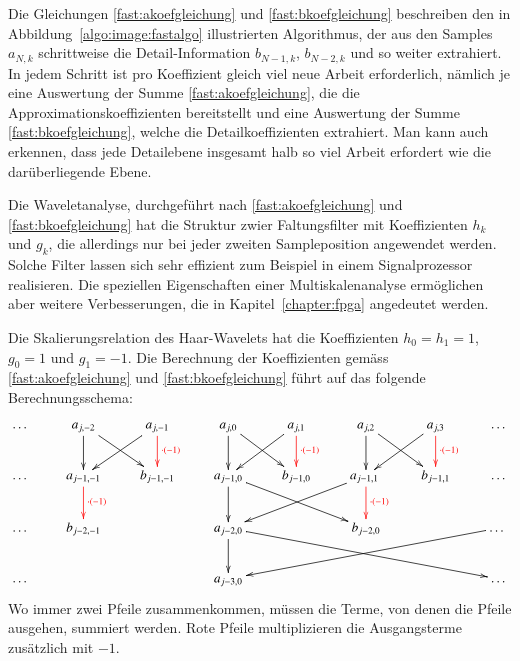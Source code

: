 Die Gleichungen \eqref{fast:akoefgleichung} und \eqref{fast:bkoefgleichung}
beschreiben den in Abbildung~\ref{algo:image:fastalgo} illustrierten
Algorithmus, der aus den Samples $a_{N,k}$ schrittweise die
Detail-Information $b_{N-1,k}$, $b_{N-2,k}$ und so weiter extrahiert.
In jedem Schritt ist pro Koeffizient gleich viel neue Arbeit erforderlich,
nämlich je eine Auswertung der Summe \eqref{fast:akoefgleichung}, die die
Approximationskoeffizienten bereitstellt und eine Auswertung der Summe
\eqref{fast:bkoefgleichung}, welche die Detailkoeffizienten extrahiert.
Man kann auch erkennen, dass jede Detailebene insgesamt halb so viel
Arbeit erfordert wie die darüberliegende Ebene.

Die Waveletanalyse, durchgeführt nach \eqref{fast:akoefgleichung}
und \eqref{fast:bkoefgleichung} hat die Struktur zwier Faltungsfilter mit
%
Koeffizienten $h_k$ und $g_k$, die allerdings nur bei jeder
zweiten Sampleposition angewendet werden.
Solche Filter lassen sich sehr effizient zum Beispiel in einem Signalprozessor
realisieren.
Die speziellen Eigenschaften einer Multiskalenanalyse ermöglichen aber 
weitere Verbesserungen, die in Kapitel~\ref{chapter:fpga} angedeutet werden.

\begin{beispiel}
Die Skalierungsrelation des Haar-Wavelets hat die Koeffizienten
$h_0=h_1=1$, $g_0=1$ und $g_1=-1$.
Die Berechnung der Koeffizienten gemäss \eqref{fast:akoefgleichung}
und \eqref{fast:bkoefgleichung} führt auf das folgende Berechnungsschema:
\[
\xymatrix{
\dots
	&a_{j,-2} \ar[d] \ar[dr]
		&a_{j,-1} \ar@[red][d]^{\color{red}\cdot (-1)} \ar[dl]
			&a_{j,0} \ar[d] \ar[dr]
				&a_{j,1} \ar@[red][d]^{\color{red}\cdot (-1)} \ar[dl]
					&a_{j,2} \ar[d] \ar[dr]
						&a_{j,3} \ar@[red][d]^{\color{red}\cdot (-1)} \ar[dl]
							&\dots
\\
\dots
	&a_{j-1,-1} \ar@[red][d]^{\color{red}\cdot(-1)}
		&b_{j-1,-1}
			&a_{j-1,0}\ar[d] \ar[drr]
				&b_{j-1,0}
					&a_{j-1,1} \ar@[red][d]^{\color{red}\cdot (-1)} \ar[dll]
						&b_{j-1,1}
							&\dots
\\
\dots &b_{j-2,-1} 
		&
			&a_{j-2,0} \ar[d] \ar[drrrr]
				&
					&b_{j-2,0}
						&
							&\dots \ar[dllll]
\\
\dots &
		&
			&a_{j-3,0}
				&
					&
						&
							&\dots
}
\]
Wo immer zwei Pfeile zusammenkommen, müssen die Terme, von denen die
Pfeile ausgehen, summiert werden.
Rote Pfeile multiplizieren die Ausgangsterme zusätzlich mit $-1$.
\end{beispiel}

